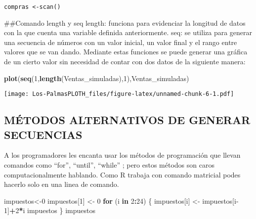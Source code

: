 \documentclass[
]{article}
\newenvironment{Shaded}{\begin{snugshade}}{\end{snugshade}}
\newcommand{\ControlFlowTok}[1]{\textcolor[rgb]{0.13,0.29,0.53}{\textbf{#1}}}
\newcommand{\DecValTok}[1]{\textcolor[rgb]{0.00,0.00,0.81}{#1}}
\newcommand{\FunctionTok}[1]{\textcolor[rgb]{0.13,0.29,0.53}{\textbf{#1}}}
\newcommand{\NormalTok}[1]{#1}
\newcommand{\OtherTok}[1]{\textcolor[rgb]{0.56,0.35,0.01}{#1}}
\newcommand{\SpecialCharTok}[1]{\textcolor[rgb]{0.81,0.36,0.00}{\textbf{#1}}}
\begin{document}
\begin{verbatim}
compras <-scan()
\end{verbatim}

\#\#Comando length y seq length: funciona para evidenciar la longitud de
datos con la que cuenta una variable definida anteriormente. seq: se
utiliza para generar una secuencia de números con un valor inicial, un
valor final y el rango entre valores que se van dando. Mediante estas
funciones se puede generar una gráfica de un cierto valor sin necesidad
de contar con dos datos de la siguiente manera:

\begin{Shaded}
\begin{Highlighting}[]
\FunctionTok{plot}\NormalTok{(}\FunctionTok{seq}\NormalTok{(}\DecValTok{1}\NormalTok{,}\FunctionTok{length}\NormalTok{(Ventas\_simuladas),}\DecValTok{1}\NormalTok{),Ventas\_simuladas)}
\end{Highlighting}
\end{Shaded}

\texttt{[image: Los-PalmasPLOTH\_files/figure-latex/unnamed-chunk-6-1.pdf]}

\hypertarget{muxe9todos-alternativos-de-generar-secuencias}{%
\subsection{MÉTODOS ALTERNATIVOS DE GENERAR
SECUENCIAS}\label{muxe9todos-alternativos-de-generar-secuencias}}

A los programadores les encanta usar los métodos de programación que
llevan comandos como ``for'', ``until'', ``while'' ; pero estos métodos
son caros computacionalmente hablando. Como R trabaja con comando
matricial podes hacerlo solo en una linea de comando.

\begin{Shaded}
\begin{Highlighting}[]
\NormalTok{impuestos}\OtherTok{\textless{}{-}}\DecValTok{0}
\NormalTok{impuestos[}\DecValTok{1}\NormalTok{] }\OtherTok{\textless{}{-}} \DecValTok{0}
\ControlFlowTok{for}\NormalTok{ (i }\ControlFlowTok{in} \DecValTok{2}\SpecialCharTok{:}\DecValTok{24}\NormalTok{) \{}
\NormalTok{impuestos[i] }\OtherTok{\textless{}{-}}\NormalTok{ impuestos[i}\DecValTok{{-}1}\NormalTok{]}\SpecialCharTok{+}\DecValTok{2}\SpecialCharTok{*}\NormalTok{i}
\NormalTok{impuestos}
\NormalTok{\}}
\NormalTok{impuestos}
\end{Highlighting}
\end{Shaded}
\end{document}
